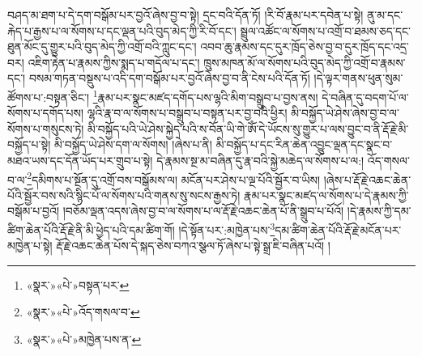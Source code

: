 བཤད་མ་ཐག་པ་དེ་དག་བསྒོམ་པར་བྱའོ་ཞེས་བྱ་བ་སྟེ། དྲང་བའི་དོན་ཏོ། །རི་བོ་རྣམ་པར་དབེན་པ་སྟེ། ནུ་མ་དང་རྐེད་པ་རྒྱས་པ་ལ་སོགས་པ་དང་ལྡན་པའི་བུད་མེད་ཀྱི་རི་བོ་དང་། སྦྲུལ་འཚོང་ལ་སོགས་པ་འགྲོ་བ་ཐམས་ཅད་དང་ཐུན་མོང་དུ་གྱུར་པའི་བུད་མེད་ཀྱི་འགྲོ་བའི་ཀླུང་དང་། འབབ་ཆུ་རྣམས་དང་དུར་ཁྲོད་ཅེས་བྱ་བ་དུར་ཁྲོད་དང་འདྲ་བར། འཇིག་རྟེན་པ་རྣམས་ཀྱིས་སྨད་པ་གདོལ་པ་དང་། ཁྲུས་མཁན་མོ་ལ་སོགས་པའི་བུད་མེད་ཀྱི་འགྲོ་བ་རྣམས་དང་། བསམ་གཏན་བསྡུས་པ་འདི་དག་བསྒོམ་པར་བྱའོ་ཞེས་བྱ་བ་ནི་ངེས་པའི་དོན་ཏོ། །དེ་ལྟར་གནས་ཕུན་སུམ་ཚོགས་པ་:བསྟན་ཅིང་། \footnote{«སྣར་»«པེ་»བསྟན་པར་}རྣམ་པར་སྣང་མཛད་དགོད་པས་ལྷའི་མིག་བསྒྲུབ་པ་བྱས་ནས། དེ་བཞིན་དུ་བདག་པོ་ལ་སོགས་པ་དགོད་པས། ལྷའི་རྣ་བ་ལ་སོགས་པ་བསྒྲུབ་པ་བསྟན་པར་བྱ་བའི་ཕྱིར། མི་བསྐྱོད་ཡེ་ཤེས་ཞེས་བྱ་བ་ལ་སོགས་པ་གསུངས་ཏེ། མི་བསྐྱོད་པའི་ཡེ་ཤེས་སྐྱེད་པའི་ས་བོན་ཡི་གེ་ཨོཾ་དེ་ཡོངས་སུ་གྱུར་པ་ལས་བྱུང་བ་ནི་རྡོ་རྗེ་མི་བསྐྱོད་པ་སྟེ། མི་བསྐྱོད་ཡེ་ཤེས་དག་ལ་སོགས། །ཞེས་པ་ནི། མི་བསྐྱོད་པ་དང་རིན་ཆེན་འབྱུང་ལྡན་དང་སྣང་བ་མཐའ་ཡས་དང་དོན་ཡོད་པར་གྲུབ་པ་སྟེ། དེ་རྣམས་སྔ་མ་བཞིན་དུ་རྣ་བའི་སྐྱེ་མཆེད་ལ་སོགས་པ་ལ:། འོད་གསལ་བ་ལ་\footnote{«སྣར་»«པེ་»འོད་གསལ་བ་}དམིགས་པ་སྔོན་དུ་འགྲོ་བས་བསྒོམས་ལ། མངོན་པར་ཤེས་པ་ལྔ་པོའི་སྦྱོར་བ་ཡིས། །ཞེས་པ་རྡོ་རྗེ་འཆང་ཆེན་པོའི་སྦྱོར་བས་སའི་སྙིང་པོ་ལ་སོགས་པའི་གནས་སུ་སངས་རྒྱས་ཏེ། རྣམ་པར་སྣང་མཛད་ལ་སོགས་པ་དེ་རྣམས་ཀྱི་བསྒོམ་པ་བྱའོ། །བཅོམ་ལྡན་འདས་ཞེས་བྱ་བ་ལ་སོགས་པ་ལ་རྡོ་རྗེ་འཆང་ཆེན་པོ་ནི་སྒྲུབ་པ་པོའོ། །དེ་རྣམས་ཀྱི་དམ་ཚིག་ཆེན་པོའི་རྡོ་རྗེ་ནི་མི་ཕྱེད་པའི་དམ་ཚིག་གོ། །དེ་སྟོན་པར་:མཁྱེན་པས་\footnote{«སྣར་»«པེ་»མཁྱེན་པས་ན་}དམ་ཚིག་ཆེན་པོའི་རྡོ་རྗེ་མངོན་པར་མཁྱེན་པ་སྟེ། རྡོ་རྗེ་འཆང་ཆེན་པོས་དེ་སྐད་ཅེས་བཀའ་སྩལ་ཏོ་ཞེས་པ་སྟེ་སྒྲ་ཇི་བཞིན་པའོ། །
